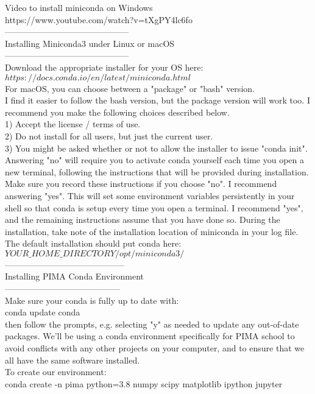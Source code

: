 \documentclass[11pt]{book}
\begin{document}
Video to install miniconda on Windows \\
https://www.youtube.com/watch?v=tXgPY4lc6fo \\

-------------------------------------------- \\
Installing Miniconda3 under Linux or macOS \\
-------------------------------------------- \\
Download the appropriate installer for your OS here:
$https://docs.conda.io/en/latest/miniconda.html$ \\
For macOS, you can choose between a "package" or "bash" version. \\
I find it easier to follow the bash version, but the package version will work too.  I recommend you make the following choices described below.\\
1)  Accept the license / terms of use. \\
2)  Do not install for all users, but just the current user.\\
3)  You might be asked whether or not to allow the installer to issue "conda init".  \\
Answering "no" will require you to activate conda yourself each time you open a new terminal, following the instructions that will be provided during installation.   Make sure you record these instructions if you choose "no".   I recommend answering "yes".  This will set some environment variables persistently in  your shell so that conda is setup every time you open a terminal.  
I recommend "yes", and the remaining instructions assume that you have done so.
During the installation, take note of the installation location of miniconda in your log file.
The default installation should put conda here:  
$YOUR\_HOME\_DIRECTORY/opt/miniconda3/$ \\
------------------------------------------\\
Installing PIMA  Conda Environment\\
-----------------------------------------\\
Make sure your conda is fully up to date with:\\
conda update conda \\
then follow the prompts, e.g. selecting "y" as needed to update any out-of-date packages. We'll be using a conda environment specifically for PIMA school to avoid conflicts with any other projects on your computer, and to ensure that we all have the same software installed.  \\
To create our environment:  \\
conda create -n pima python=3.8 numpy scipy matplotlib ipython jupyter \\
\end{document}
